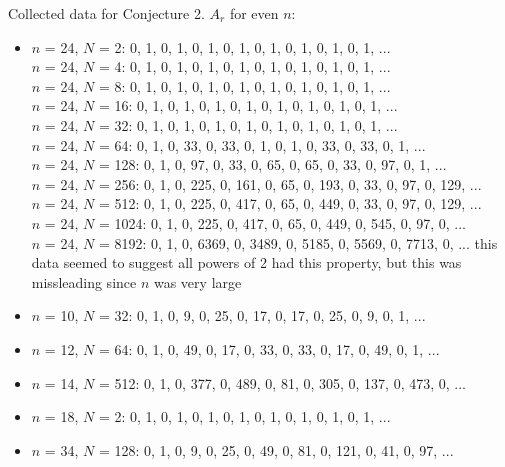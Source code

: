 \documentclass{article}
\begin{document}
\begin{flushleft}
    Collected data for Conjecture 2. $A_r$ for even $n$:
    \begin{itemize}
        \item  $n$ = 24, $N$ = 2:  0, 1, 0, 1, 0, 1, 0, 1, 0, 1, 0, 1, 0, 1, 0, 1, ...
            \\ $n$ = 24, $N$ = 4:  0, 1, 0, 1, 0, 1, 0, 1, 0, 1, 0, 1, 0, 1, 0, 1, ...
            \\ $n$ = 24, $N$ = 8:  0, 1, 0, 1, 0, 1, 0, 1, 0, 1, 0, 1, 0, 1, 0, 1, ...
            \\ $n$ = 24, $N$ = 16:  0, 1, 0, 1, 0, 1, 0, 1, 0, 1, 0, 1, 0, 1, 0, 1, ...
            \\ $n$ = 24, $N$ = 32:  0, 1, 0, 1, 0, 1, 0, 1, 0, 1, 0, 1, 0, 1, 0, 1, ...
            \\ $n$ = 24, $N$ = 64:  0, 1, 0, 33, 0, 33, 0, 1, 0, 1, 0, 33, 0, 33, 0, 1, ...
            \\ $n$ = 24, $N$ = 128:  0, 1, 0, 97, 0, 33, 0, 65, 0, 65, 0, 33, 0, 97, 0, 1, ...
            \\ $n$ = 24, $N$ = 256:  0, 1, 0, 225, 0, 161, 0, 65, 0, 193, 0, 33, 0, 97, 0, 129, ...
            \\ $n$ = 24, $N$ = 512:  0, 1, 0, 225, 0, 417, 0, 65, 0, 449, 0, 33, 0, 97, 0, 129, ...
            \\ $n$ = 24, $N$ = 1024:  0, 1, 0, 225, 0, 417, 0, 65, 0, 449, 0, 545, 0, 97, 0, ...
            \\ $n$ = 24, $N$ = 8192:  0, 1, 0, 6369, 0, 3489, 0, 5185, 0, 5569, 0, 7713, 0, ...
            this data seemed to suggest all powers of 2 had this property, but this was missleading since $n$ was very large
        \item $n$ = 10, $N$ = 32:  0, 1, 0, 9, 0, 25, 0, 17, 0, 17, 0, 25, 0, 9, 0, 1, ...
        \item $n$ = 12, $N$ = 64:  0, 1, 0, 49, 0, 17, 0, 33, 0, 33, 0, 17, 0, 49, 0, 1, ...
        \item $n$ = 14, $N$ = 512:  0, 1, 0, 377, 0, 489, 0, 81, 0, 305, 0, 137, 0, 473, 0, ...
        \item $n$ = 18, $N$ = 2:  0, 1, 0, 1, 0, 1, 0, 1, 0, 1, 0, 1, 0, 1, 0, 1, ...
        \item $n$ = 34, $N$ = 128:  0, 1, 0, 9, 0, 25, 0, 49, 0, 81, 0, 121, 0, 41, 0, 97, ...

\end{itemize}
\end{flushleft}
\end{document}
